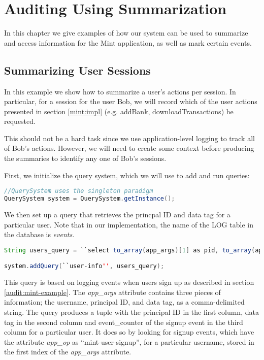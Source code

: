 \chapter{Auditing Using Summarization}

In this chapter we give examples of how our system can be used to summarize and access information for the Mint application, as well as mark certain events.

\section{Summarizing User Sessions}
\label{sum:sessions}
In this example we show how to summarize a user's actions per session. In particular, for a session for the user Bob, we will record which of the user actions presented in section \ref{mint:impl} (e.g. addBank, downloadTransactions) he requested.

This should not be a hard task since we use application-level logging to track all of Bob's actions. However, we will need to create some context before producing the summaries to identify any one of Bob's sessions.

First, we initialize the query system, which we will use to add and run queries:

\begin{lstlisting}[language=Java]
//QuerySystem uses the singleton paradigm
QuerySystem system = QuerySystem.getInstance();
\end{lstlisting}

We then set up a query that retrieves the princpal ID and data tag for a particular user. Note that in our implementation, the name of the LOG table in the database is \emph{events}.

\begin{lstlisting}[language=Java]
String users_query = ``select to_array(app_args)[1] as pid, to_array(app_args)[2] as tag, event_counter from events where app_op='mint-user-signup' and to_array(app_args)[0] = ?'';

system.addQuery(``user-info'', users_query);
\end{lstlisting}

\noindent
This query is based on logging events when users sign up as described in section \ref{audit:mint-example}. The \emph{app\_args} attribute contains three pieces of information; the username, principal ID, and data tag, as a comma-delimited string. The query produces a tuple with the principal ID in the first column, data tag in the second column and event\_counter of the signup event in the third column for a particular user. It does so by looking for signup events, which have the attribute \emph{app\_op} as ``mint-user-signup'', for a particular username, stored in the first index of the \emph{app\_args} attribute. 

